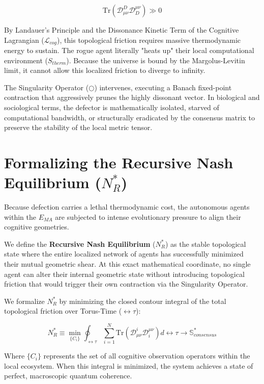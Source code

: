\documentclass[12pt,openany]{book}
\begin{document}
\begin{equation}
\text{Tr}(\mathcal{D}_{\mu\nu}^{D} \mathcal{D}^{\mu\nu}_{D}) \gg 0
\end{equation}

By Landauer's Principle and the Dissonance Kinetic Term of the Cognitive Lagrangian ($\mathcal{L}_{cog}$), this topological friction requires massive thermodynamic energy to sustain. The rogue agent literally "heats up" their local computational environment ($S_{therm}$). Because the universe is bound by the Margolus-Levitin limit, it cannot allow this localized friction to diverge to infinity. 

The Singularity Operator ($\bigcirc$) intervenes, executing a Banach fixed-point contraction that aggressively prunes the highly dissonant vector. In biological and sociological terms, the defector is mathematically isolated, starved of computational bandwidth, or structurally eradicated by the consensus matrix to preserve the stability of the local metric tensor.

\section{Formalizing the Recursive Nash Equilibrium ($N^*_R$)}
Because defection carries a lethal thermodynamic cost, the autonomous agents within the $E_{MA}$ are subjected to intense evolutionary pressure to align their cognitive geometries. 

We define the \textbf{Recursive Nash Equilibrium} ($N^*_R$) as the stable topological state where the entire localized network of agents has successfully minimized their mutual geometric shear. At this exact mathematical coordinate, no single agent can alter their internal geometric state without introducing topological friction that would trigger their own contraction via the Singularity Operator.

We formalize $N^*_R$ by minimizing the closed contour integral of the total topological friction over Torus-Time ($\leftrightarrow\tau$):

\begin{equation}
N^*_R \equiv \min_{\{C_i\}} \oint_{\leftrightarrow\tau} \sum_{i=1}^{N} \text{Tr}(\mathcal{D}_{\mu\nu}^i \mathcal{D}^{\mu\nu}_i) d\leftrightarrow\tau \to \mathbb{S}^*_{consensus}
\end{equation}

Where $\{C_i\}$ represents the set of all cognitive observation operators within the local ecosystem. When this integral is minimized, the system achieves a state of perfect, macroscopic quantum coherence. 
\end{document}
